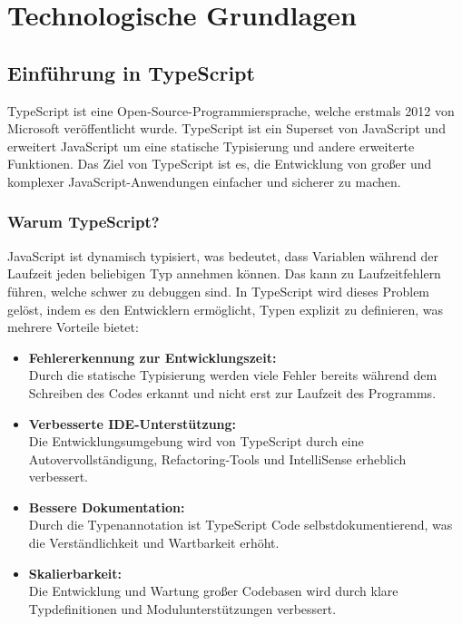 \section{Technologische Grundlagen}
\subsection[Einführung in TypeScript]{Einführung in TypeScript}
TypeScript ist eine Open-Source-Programmiersprache, welche erstmals 2012 von Microsoft veröffentlicht wurde.
TypeScript ist ein Superset von JavaScript und erweitert JavaScript um eine statische Typisierung und andere erweiterte Funktionen.
Das Ziel von TypeScript ist es, die Entwicklung von großer und komplexer JavaScript-Anwendungen einfacher und sicherer zu machen.
\subsubsection[Warum TypeScript?]{Warum TypeScript?}
JavaScript ist dynamisch typisiert, was bedeutet, dass Variablen während der Laufzeit jeden beliebigen Typ annehmen können. Das kann zu Laufzeitfehlern führen, welche schwer zu debuggen sind.
In TypeScript wird dieses Problem gelöst, indem es den Entwicklern ermöglicht, Typen explizit zu definieren, was mehrere Vorteile bietet:

\begin{itemize}
    \item \textbf{Fehlererkennung zur Entwicklungszeit:} \\   Durch die statische Typisierung werden viele Fehler bereits während dem Schreiben des Codes erkannt und nicht erst zur Laufzeit des Programms.
    \item \textbf{Verbesserte IDE-Unterstützung:} \\    Die Entwicklungsumgebung wird von TypeScript durch eine Autovervollständigung, Refactoring-Tools und IntelliSense erheblich verbessert.
    \item \textbf{Bessere Dokumentation:} \\     Durch die Typenannotation ist TypeScript Code selbstdokumentierend, was die Verständlichkeit und Wartbarkeit erhöht.
    \item \textbf{Skalierbarkeit:} \\   Die Entwicklung und Wartung großer Codebasen wird durch klare Typdefinitionen und Modulunterstützungen verbessert.  
\end{itemize}

\newpage

